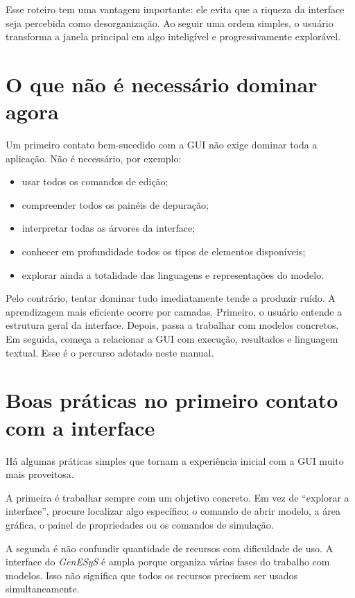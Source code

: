 Esse roteiro tem uma vantagem importante: ele evita que a riqueza da interface seja percebida como desorganização. Ao seguir uma ordem simples, o usuário transforma a janela principal em algo inteligível e progressivamente explorável.

\section{O que não é necessário dominar agora}
\label{sec:cap3_o_que_nao_dominar_agora}

Um primeiro contato bem-sucedido com a GUI não exige dominar toda a aplicação. Não é necessário, por exemplo:
\begin{itemize}
    \item usar todos os comandos de edição;
    \item compreender todos os painéis de depuração;
    \item interpretar todas as árvores da interface;
    \item conhecer em profundidade todos os tipos de elementos disponíveis;
    \item explorar ainda a totalidade das linguagens e representações do modelo.
\end{itemize}

Pelo contrário, tentar dominar tudo imediatamente tende a produzir ruído. A aprendizagem mais eficiente ocorre por camadas. Primeiro, o usuário entende a estrutura geral da interface. Depois, passa a trabalhar com modelos concretos. Em seguida, começa a relacionar a GUI com execução, resultados e linguagem textual. Esse é o percurso adotado neste manual.

\section{Boas práticas no primeiro contato com a interface}
\label{sec:cap3_boas_praticas_primeiro_contato}

Há algumas práticas simples que tornam a experiência inicial com a GUI muito mais proveitosa.

A primeira é trabalhar sempre com um objetivo concreto. Em vez de ``explorar a interface'', procure localizar algo específico: o comando de abrir modelo, a área gráfica, o painel de propriedades ou os comandos de simulação.

A segunda é não confundir quantidade de recursos com dificuldade de uso. A interface do \textit{GenESyS} é ampla porque organiza várias fases do trabalho com modelos. Isso não significa que todos os recursos precisem ser usados simultaneamente.

